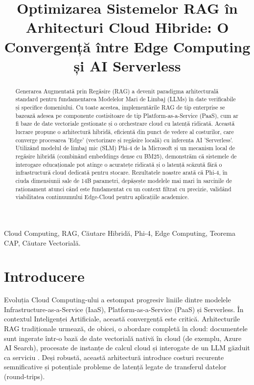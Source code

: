\documentclass[conference]{IEEEtran}
\begin{document}
\title{Optimizarea Sistemelor RAG în Arhitecturi Cloud Hibride: O Convergență între Edge Computing și AI Serverless}

\author{
}

\maketitle

\begin{abstract}
Generarea Augmentată prin Regăsire (RAG) a devenit paradigma arhitecturală standard pentru fundamentarea Modelelor Mari de Limbaj (LLMs) în date verificabile și specifice domeniului. Cu toate acestea, implementările RAG de tip enterprise se bazează adesea pe componente costisitoare de tip Platform-as-a-Service (PaaS), cum ar fi baze de date vectoriale gestionate și o orchestrare cloud cu latență ridicată. Această lucrare propune o arhitectură hibridă, eficientă din punct de vedere al costurilor, care converge procesarea 'Edge' (vectorizare și regăsire locală) cu inferența AI 'Serverless'. Utilizând modelul de limbaj mic (SLM) Phi-4 de la Microsoft și un mecanism local de regăsire hibridă (combinând embeddings dense cu BM25), demonstrăm că sistemele de interogare educaționale pot atinge o acuratețe ridicată și o latență scăzută fără o infrastructură cloud dedicată pentru stocare. Rezultatele noastre arată că Phi-4, în ciuda dimensiunii sale de 14B parametri, depășește modelele mai mari în sarcinile de raționament atunci când este fundamentat cu un context filtrat cu precizie, validând viabilitatea continuumului Edge-Cloud pentru aplicațiile academice.
\end{abstract}

\begin{IEEEkeywords}
Cloud Computing, RAG, Căutare Hibridă, Phi-4, Edge Computing, Teorema CAP, Căutare Vectorială.
\end{IEEEkeywords}

\section{Introducere}
Evoluția Cloud Computing-ului a estompat progresiv liniile dintre modelele Infrastructure-as-a-Service (IaaS), Platform-as-a-Service (PaaS) și Serverless. În contextul Inteligenței Artificiale, această convergență este critică. Arhitecturile RAG tradiționale urmează, de obicei, o abordare completă în cloud: documentele sunt ingerate într-o bază de date vectorială nativă în cloud (de exemplu, Azure AI Search), procesate de instanțe de calcul cloud și interogate de un LLM găzduit ca serviciu \cite{rag_survey}. Deși robustă, această arhitectură introduce costuri recurente semnificative și potențiale probleme de latență legate de transferul datelor (round-trips).
\end{document}
